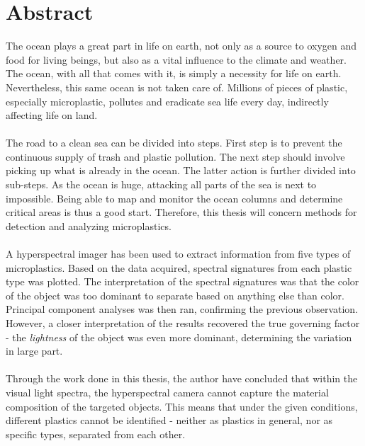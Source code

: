 \chapter*{Abstract}

The ocean plays a great part in life on earth, not only as a source to oxygen and food for living beings, but also as a vital influence to the climate and weather. The ocean, with all that comes with it, is simply a necessity for life on earth. Nevertheless, this same ocean is not taken care of. Millions of pieces of plastic, especially microplastic, pollutes and eradicate sea life every day, indirectly affecting life on land. 
\\\\
The road to a clean sea can be divided into steps. First step is to prevent the continuous supply of trash and plastic pollution. The next step should involve picking up what is already in the ocean. The latter action is further divided into sub-steps. As the ocean is huge, attacking all parts of the sea is next to impossible. Being able to map and monitor the ocean columns and determine critical areas is thus a good start. Therefore, this thesis will concern methods for detection and analyzing microplastics. 
\\\\
A hyperspectral imager has been used to extract information from five types of microplastics. Based on the data acquired, spectral signatures from each plastic type was plotted. The interpretation of the spectral signatures was that the color of the object was too dominant to separate based on anything else than color. Principal component analyses was then ran, confirming the previous observation. However, a closer interpretation of the results recovered the true governing factor - the \textit{lightness} of the object was even more dominant, determining the variation in large part. 
\\\\
Through the work done in this thesis, the author have concluded that within the visual light spectra, the hyperspectral camera cannot capture the material composition of the targeted objects. This means that under the given conditions, different plastics cannot be identified - neither as plastics in general, nor as specific types, separated from each other.


\hypersetup{pageanchor=false}
